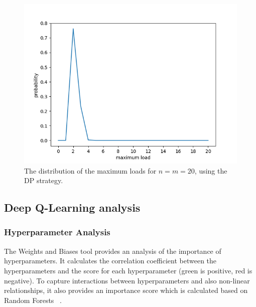 \begin{figure}[hbt!] \label{two-thinning-maxload-distribution}
    \centering
    \includegraphics[scale=1.0]{Chapter4/Figs/max_load_distribution_20_20.png}
    \caption{The distribution of the maximum loads for $n=m=20$, using the DP strategy.}
\end{figure}




\subsection{Deep Q-Learning analysis}






\subsubsection{Hyperparameter Analysis}



The Weights and Biases tool provides an analysis of the importance of hyperparameters. It calculates the correlation coefficient between the hyperparameters and the score for each hyperparameter (green is positive, red is negative). To capture interactions between hyperparameters and also non-linear relationships, it also provides an importance score which is calculated based on Random Forests ~\cite{biewald2020wandb}.


